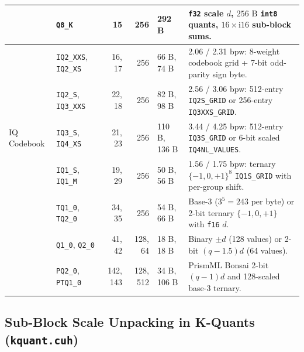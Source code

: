 \documentclass[10pt,a4paper]{article}
\theoremstyle{swzstyle}
\newcommand{\code}[1]{\texttt{#1}}
\begin{document}
\begin{table}[htbp]
\begin{tabularx}{\textwidth}{@{}llrrlX@{}}
    & \code{Q8\_K} & 15 & 256 & 292 B & \code{f32} scale $d$, $256\text{ B}$ \code{int8} quants, $16 \times \text{i16}$ sub-block sums. \\
    \midrule
    \multirow{5}{*}{IQ Codebook} & \code{IQ2\_XXS}, \code{IQ2\_XS} & 16, 17 & 256 & 66 B, 74 B & 2.06 / 2.31 bpw: 8-weight codebook grid + 7-bit odd-parity sign byte. \\
    & \code{IQ2\_S}, \code{IQ3\_XXS} & 22, 18 & 256 & 82 B, 98 B & 2.56 / 3.06 bpw: 512-entry \code{IQ2S\_GRID} or 256-entry \code{IQ3XXS\_GRID}. \\
    & \code{IQ3\_S}, \code{IQ4\_XS} & 21, 23 & 256 & 110 B, 136 B & 3.44 / 4.25 bpw: 512-entry \code{IQ3S\_GRID} or 6-bit scaled \code{IQ4NL\_VALUES}. \\
    & \code{IQ1\_S}, \code{IQ1\_M} & 19, 29 & 256 & 50 B, 56 B & 1.56 / 1.75 bpw: ternary $\{-1,0,+1\}^8$ \code{IQ1S\_GRID} with per-group shift. \\
    \midrule
    \multirow{3}{*}{Ternary / 1-2b} & \code{TQ1\_0}, \code{TQ2\_0} & 34, 35 & 256 & 54 B, 66 B & Base-3 ($3^5=243$ per byte) or 2-bit ternary $\{-1, 0, +1\}$ with \code{f16} $d$. \\
    & \code{Q1\_0}, \code{Q2\_0} & 41, 42 & 128, 64 & 18 B, 18 B & Binary $\pm d$ (128 values) or 2-bit $(q - 1.5)d$ (64 values). \\
    & \code{PQ2\_0}, \code{PTQ1\_0} & 142, 143 & 128, 512 & 34 B, 106 B & PrismML Bonsai 2-bit $(q - 1)d$ and 128-scaled base-3 ternary. \\
    \bottomrule
  \end{tabularx}
\end{table}

\subsection{Sub-Block Scale Unpacking in K-Quants (\texttt{kquant.cuh})}
\end{document}
